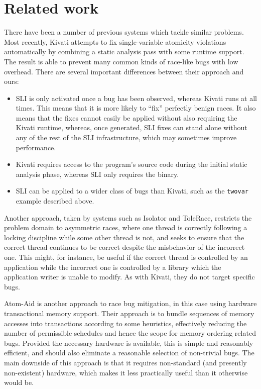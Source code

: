 \documentclass[10pt,twocolumn,preprint,natbib,authoryear]{sigplanconf}
\newcommand{\editorial}[1]{}
\begin{document}
\section{Related work}\editorial{This is a bit of a bestiary.  Could do with a bit more analysis.}

There have been a number of previous systems which tackle similar
problems.  Most recently, Kivati\cite{Chew2010a} attempts to fix
single-variable atomicity violations automatically by combining a
static analysis pass with some runtime support.  The result is able to
prevent many common kinds of race-like bugs with low overhead.  There
are several important differences between their approach and ours:

\begin{itemize}
\item SLI is only activated once a bug has been observed, whereas
  Kivati runs at all times.  This means that it is more likely to
  ``fix'' perfectly benign races.  It also means that the fixes cannot
  easily be applied without also requiring the Kivati runtime,
  whereas, once generated, SLI fixes can stand alone without any of
  the rest of the SLI infrastructure, which may sometimes improve
  performance.
\item Kivati requires access to the program's source code during the
  initial static analysis phase, whereas SLI only requires the binary.
\item SLI can be applied to a wider class of bugs than Kivati, such as
  the \verb|twovar| example described above.
\end{itemize}

\noindent
Another approach, taken by systems such as
Isolator\cite{Ramalingam2009} and ToleRace\cite{Kirovski2007},
restricts the problem domain to asymmetric races, where one thread is
correctly following a locking discipline while some other thread is
not, and seeks to ensure that the correct thread continues to be
correct despite the misbehavior of the incorrect one.  This might,
for instance, be useful if the correct thread is controlled by an
application while the incorrect one is controlled by a library which
the application writer is unable to modify.  As with Kivati, they do
not target specific bugs.

Atom-Aid\cite{Lucia2009} is another approach to race bug
mitigation, in this case using hardware transactional memory support.
Their approach is to bundle sequences of memory accesses into
transactions according to some heuristics, effectively reducing the
number of permissible schedules and hence the scope for memory
ordering related bugs.  Provided the necessary hardware is available,
this is simple and reasonably efficient, and should also eliminate a
reasonable selection of non-trivial bugs.  The main downside of this
approach is that it requires non-standard (and presently non-existent)
hardware, which makes it less practically useful than it otherwise
would be.
\end{document}
